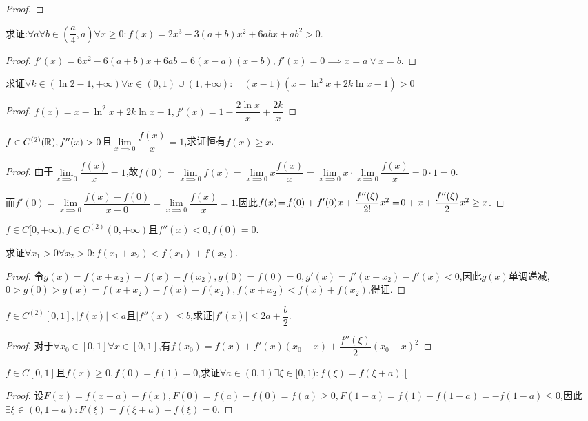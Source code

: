 \documentclass[UTF8]{book}
\begin{document}
\begin{proof}
    \end{proof}\begin{example}
        求证:$\forall a\forall b\in \left( \dfrac{a}{4},a \right)\forall x\geq 0:f(x)=2x^3-3(a+b)x^2+6abx+ab^2>0$.
    \end{example}\begin{proof}
        $f'(x)=6x^2-6(a+b)x+6ab=6(x-a)(x-b), f'(x)=0\implies x=a\lor x=b$.
    \end{proof}\begin{example}
        求证$\forall k\in (\ln 2-1,+\infty)\forall x\in (0,1)\cup (1,+\infty):\quad (x-1)(x-\ln^2 x+2k\ln x-1)>0$
    \end{example}\begin{proof}
        $f(x)=x-\ln^2 x+2k\ln x-1,f'(x)=1-\dfrac{2\ln x}{x}+{\dfrac{2k}{x}}$
    \end{proof}\begin{example}
        $f\in C^{(2)}(\mathbb{R}),f''(x)>0$且$\lim\limits_{x\implies 0}\dfrac{f(x)}{x}=1$,求证恒有$f(x)\geq x$.
    \end{example}\begin{proof}
        由于$\lim\limits_{x\implies 0}\dfrac{f(x)}{x}=1$,故$f(0)=\lim\limits_{x\implies 0}f(x)=\lim\limits_{x\implies 0}x\dfrac{f(x)}{x}=\lim\limits_{x\implies 0}x\cdot \lim\limits_{x\implies 0}\dfrac{f(x)}{x}=0\cdot 1=0$.

        而$f'(0)=\lim\limits_{x\implies 0}\dfrac{f(x)-f(0)}{x-0}=\lim\limits_{x\implies 0}\dfrac{f(x)}{x}=1$.因此$f(x)\!=\!f(0)+f'(0)x+\dfrac{f''(\xi)}{2!}x^2\!\\ =\!0+x+\dfrac{f''(\xi)}{2}x^2\geq x$.
    \end{proof}\begin{example}
        $f\in C[0,+\infty),f\in C^{(2)}(0,+\infty)$且$f''(x)<0,f(0)=0$.

        求证$\forall x_1\!>\!0\forall x_2\!>\!0:f(x_1+x_2)\!<\!f(x_1)+f(x_2)$.
    \end{example}\begin{proof}
        令$g(x)=f(x+x_2)-f(x)-f(x_2),g(0)=f(0)=0,g'(x)=f'(x+x_2)-f'(x)<0$,因此$g(x)$单调递减,$0>g(0)>g(x)=f(x+x_2)-f(x)-f(x_2),f(x+x_2)<f(x)+f(x_2)$,得证.
    \end{proof}\begin{example}
        $f\in C^{(2)}[0,1],|f(x)|\leq a$且$|f''(x)|\leq b$,求证$|f'(x)|\leq 2a+\dfrac{b}{2}$.
    \end{example}\begin{proof}
        对于$\forall x_0\in [0,1]\forall x\in [0,1]$,有$f(x_0)=f(x)+f'(x)(x_0-x)+\dfrac{f''(\xi)}{2}(x_0-x)^2$
    \end{proof}\begin{example}
        $f\in C[0,1]$且$f(x)\geq 0,f(0)=f(1)=0$,求证$\forall a\in (0,1)\exists\xi\in [0,1):f(\xi)=f(\xi+a)$.[
    \end{example}\begin{proof}
        设$F(x)=f(x+a)-f(x),F(0)=f(a)-f(0)=f(a)\geq 0,F(1-a)=f(1)-f(1-a)=-f(1-a)\leq 0$,因此$\exists\xi\in (0,1-a):F(\xi)=f(\xi+a)-f(\xi)=0$.
    \end{proof}
\end{document}
